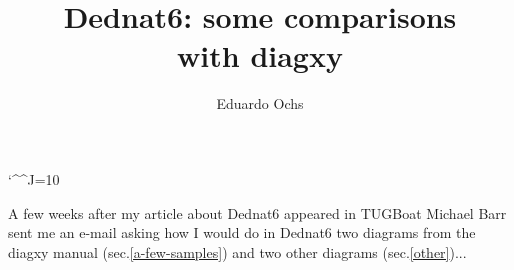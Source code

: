 \documentclass[oneside]{article}
\begin{document}
\catcode`\^^J=10

\def\co#1{{%
  \def\%{\char37}%
  \def\\{\char92}%
  \def\^{\char94}%
  \def\~{\char126}%
  \tt#1%
  }}
\def\qco#1{`\co{#1}'}
\def\qqco#1{``\co{#1}''}






\newsavebox{\barrdednatsix}
\newsavebox{\barrorig}
\newsavebox{\barrtridednatsix}
\newsavebox{\barrtriorig}
\newsavebox{\hafagaka}
\newsavebox{\xcx}


\title{Dednat6: some comparisons \\ with diagxy}

\author{Eduardo Ochs}

\maketitle


A few weeks after my article about Dednat6 appeared in TUGBoat Michael
Barr sent me an e-mail asking how I would do in Dednat6 two diagrams
from the diagxy manual (sec.\ref{a-few-samples}) and two other
diagrams (sec.\ref{other})...
\end{document}
